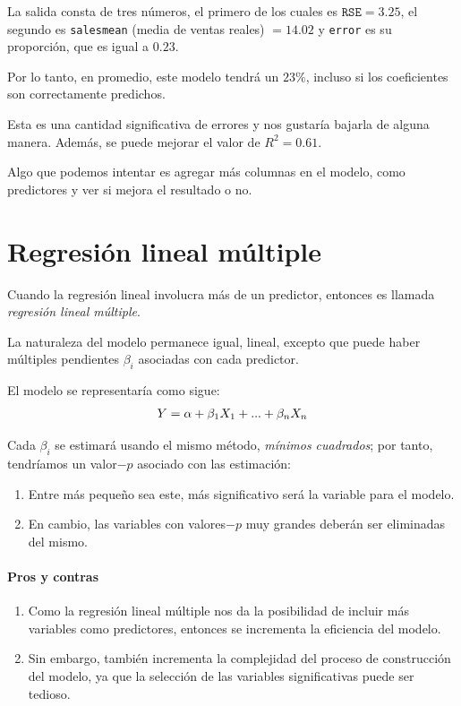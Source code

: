 La salida consta de tres números, el primero de los cuales es $\texttt{RSE} = 3.25$, el segundo es
\texttt{salesmean} (media de ventas reales) $= 14.02$ y \texttt{error} es su proporción, que es igual
a $0.23$.




Por lo tanto, en promedio, este modelo tendrá un $23\%$, incluso si los coeficientes son
correctamente predichos.



Esta es una cantidad significativa de errores y nos gustaría bajarla de alguna manera. Además, se puede mejorar el valor de $R^{2}=0.61$.



Algo que
podemos intentar es agregar más columnas en el modelo, como predictores y ver si mejora el resultado o no.


\section{Regresión lineal múltiple}

Cuando la regresión lineal involucra más de un predictor, entonces es llamada \emph{regresión lineal múltiple}.



La naturaleza del modelo permanece igual, lineal, excepto que puede haber múltiples pendientes $\beta_{i}$ asociadas con cada predictor.




 El modelo se representaría como sigue:
 \begin{align}
 Y = \alpha + \beta_{1}X_{1}+...+\beta_{n}X_{n}
\end{align}



Cada $\beta_{i}$ se estimará usando el mismo método, \emph{mínimos cuadrados}; por tanto, tendríamos un valor$-p$ asociado con las estimación: 
\begin{enumerate}
 \item Entre más pequeño sea este, más significativo será la variable para el modelo. 
 \item En cambio, las variables con valores$-p$ muy grandes deberán ser eliminadas del mismo.
\end{enumerate}


\paragraph{Pros y contras}
 \begin{enumerate}
  \item Como la regresión lineal múltiple nos da la posibilidad de incluir más variables como predictores, entonces se incrementa la eficiencia del modelo. 

 \item Sin embargo, también incrementa la complejidad del proceso de construcción del modelo, ya que la selección de las variables significativas puede ser tedioso.
 \end{enumerate}


